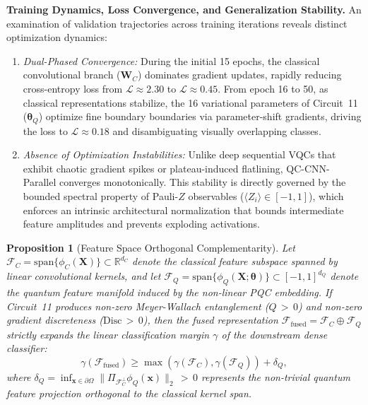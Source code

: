 \documentclass[journal]{IEEEtran}
\newtheorem{proposition}{Proposition}
\begin{document}
\textbf{Training Dynamics, Loss Convergence, and Generalization Stability.} 
An examination of validation trajectories across training iterations reveals distinct optimization dynamics:
\begin{enumerate}
    \item \textit{Dual-Phased Convergence:} During the initial 15 epochs, the classical convolutional branch ($\mathbf{W}_C$) dominates gradient updates, rapidly reducing cross-entropy loss from $\mathcal{L} \approx 2.30$ to $\mathcal{L} \approx 0.45$. From epoch 16 to 50, as classical representations stabilize, the 16 variational parameters of Circuit~11 ($\boldsymbol{\theta}_Q$) optimize fine boundary boundaries via parameter-shift gradients, driving the loss to $\mathcal{L} \approx 0.18$ and disambiguating visually overlapping classes.
    \item \textit{Absence of Optimization Instabilities:} Unlike deep sequential VQCs that exhibit chaotic gradient spikes or plateau-induced flatlining, QC-CNN-Parallel converges monotonically. This stability is directly governed by the bounded spectral property of Pauli-$Z$ observables ($\langle Z_i \rangle \in [-1, 1]$), which enforces an intrinsic architectural normalization that bounds intermediate feature amplitudes and prevents exploding activations.
\end{enumerate}

\begin{proposition}[Feature Space Orthogonal Complementarity]
\label{prop:feature_complementarity}
Let $\mathcal{F}_C = \mathrm{span}\{\phi_C(\mathbf{X})\} \subset \mathbb{R}^{d_C}$ denote the classical feature subspace spanned by linear convolutional kernels, and let $\mathcal{F}_Q = \mathrm{span}\{\phi_Q(\mathbf{X}; \boldsymbol{\theta})\} \subset [-1, 1]^{d_Q}$ denote the quantum feature manifold induced by the non-linear PQC embedding. If Circuit~11 produces non-zero Meyer-Wallach entanglement ($Q \,{>}\, 0$) and non-zero gradient discreteness ($\mathrm{Disc} \,{>}\, 0$), then the fused representation $\mathcal{F}_{\mathrm{fused}} = \mathcal{F}_C \oplus \mathcal{F}_Q$ strictly expands the linear classification margin $\gamma$ of the downstream dense classifier:
\begin{equation}
\gamma(\mathcal{F}_{\mathrm{fused}}) \ge \max\left( \gamma(\mathcal{F}_C), \gamma(\mathcal{F}_Q) \right) + \delta_Q,
\label{eq:margin_expansion}
\end{equation}
where $\delta_Q = \inf_{\mathbf{x} \in \partial \Omega} \|\Pi_{\mathcal{F}_C^\perp} \phi_Q(\mathbf{x})\|_2 \,{>}\, 0$ represents the non-trivial quantum feature projection orthogonal to the classical kernel span.
\end{proposition}
\end{document}
